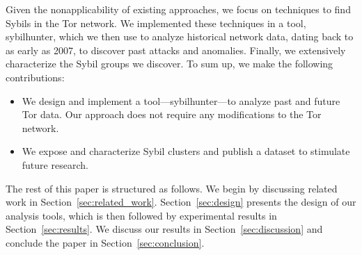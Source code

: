 Given the nonapplicability of existing approaches, we focus on techniques to
find Sybils in the Tor network.  We implemented these techniques in a tool,
sybilhunter, which we then use to analyze historical network data, dating back
to as early as 2007, to discover past attacks and anomalies.  Finally, we
extensively characterize the Sybil groups we discover.  To sum up, we make
the following contributions:
\begin{itemize}
	\item We design and implement a tool---sybilhunter---to analyze past and
		future Tor data.  Our approach does not require any modifications to the
		Tor network.
	\item We expose and characterize Sybil clusters and publish a dataset to
		stimulate future research.
\end{itemize}

The rest of this paper is structured as follows.  We begin by discussing
related work in Section~\ref{sec:related_work}.  Section~\ref{sec:design}
presents the design of our analysis tools, which is then followed by
experimental results in Section~\ref{sec:results}.  We discuss our results in
Section~\ref{sec:discussion} and conclude the paper in
Section~\ref{sec:conclusion}.
